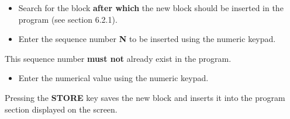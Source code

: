 \begin{itemize}
    \item Search for the block \textbf{after which} the new block should be inserted in the program (see section 6.2.1).
\end{itemize}

\begin{itemize}
\end{itemize}

\vspace{.5cm}

\begin{itemize}
    \item Enter the sequence number \textbf{N} to be inserted using the numeric keypad.
\end{itemize}

This sequence number \textbf{must not} already exist in the program.

\begin{itemize}
\end{itemize}

\vspace{.5cm}

\begin{itemize}
\end{itemize}

\begin{itemize}
    \item Enter the numerical value using the numeric keypad.
\end{itemize}

\begin{itemize}
\end{itemize}

\begin{itemize}
\end{itemize}

\vspace{.5cm}

Pressing the \textbf{STORE} key saves the new block and inserts it into the program section displayed on the screen.

